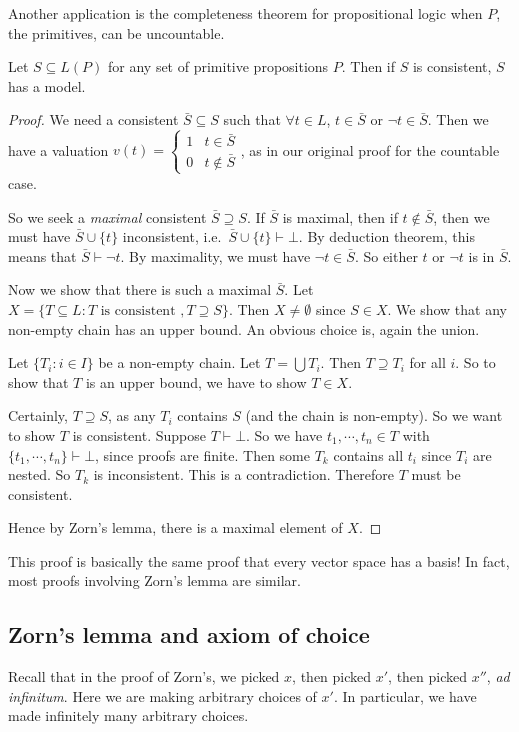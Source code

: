 \documentclass[a4paper]{article}
\begin{document}
Another application is the completeness theorem for propositional logic when $P$, the primitives, can be uncountable.

\begin{thm}
  Let $S\subseteq L(P)$ for any set of primitive propositions $P$. Then if $S$ is consistent, $S$ has a model.
\end{thm}

\begin{proof}
  We need a consistent $\bar S \subseteq S$ such that $\forall t\in L$, $t\in \bar S$ or $\neg t\in \bar S$. Then we have a valuation $v(t) = \begin{cases} 1 & t\in \bar S \\ 0 & t\not\in \bar S\end{cases}$, as in our original proof for the countable case.

  So we seek a \emph{maximal} consistent $\bar S\supseteq S$. If $\bar S$ is maximal, then if $t\not\in \bar S$, then we must have $\bar S \cup \{t\}$ inconsistent, i.e.\ $\bar S \cup \{t\}\vdash \bot$. By deduction theorem, this means that $\bar S \vdash \neg t$. By maximality, we must have $\neg t \in \bar S$. So either $t$ or $\neg t$ is in $\bar S$.

  Now we show that there is such a maximal $\bar S$. Let $X = \{ T\subseteq L: T\text{ is consistent }, T\supseteq S\}$. Then $X\not=\emptyset$ since $S\in X$. We show that any non-empty chain has an upper bound. An obvious choice is, again the union.

  Let $\{T_i: i\in I\}$ be a non-empty chain. Let $T = \bigcup T_i$. Then $T\supseteq T_i$ for all $i$. So to show that $T$ is an upper bound, we have to show $T\in X$.

  Certainly, $T\supseteq S$, as any $T_i$ contains $S$ (and the chain is non-empty). So we want to show $T$ is consistent. Suppose $T\vdash \bot$. So we have $t_1, \cdots, t_n \in T$ with $\{t_1, \cdots, t_n\} \vdash \bot$, since proofs are finite. Then some $T_k$ contains all $t_i$ since $T_i$ are nested. So $T_k$ is inconsistent. This is a contradiction. Therefore $T$ must be consistent.

  Hence by Zorn's lemma, there is a maximal element of $X$.
\end{proof}
This proof is basically the same proof that every vector space has a basis! In fact, most proofs involving Zorn's lemma are similar.

\subsection{Zorn's lemma and axiom of choice}
Recall that in the proof of Zorn's, we picked $x$, then picked $x'$, then picked $x''$, \emph{ad infinitum}. Here we are making arbitrary choices of $x'$. In particular, we have made infinitely many arbitrary choices.
\end{document}
